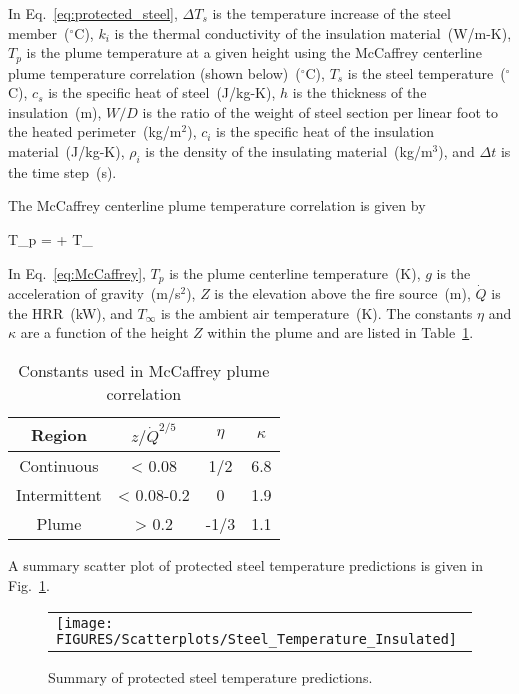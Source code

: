 In Eq.~\ref{eq:protected_steel}, $\Delta T_s$ is the temperature increase of the steel member~($^\circ$C), $k_i$ is the thermal conductivity of the insulation material~(W/m-K), $T_p$ is the plume temperature at a given height using the McCaffrey centerline plume temperature correlation (shown below)~($^\circ$C), $T_s$ is the steel temperature~($^\circ$C), $c_s$ is the specific heat of steel~(J/kg-K), $h$ is the thickness of the insulation~(m), $W/D$ is the ratio of the weight of steel section per linear foot to the heated perimeter~(kg/m$^2$), $c_i$ is the specific heat of the insulation material~(J/kg-K), $\rho_i$ is the density of the insulating material~(kg/m$^3$), and $\Delta t$ is the time step~(s).

The McCaffrey centerline plume temperature correlation is given by

\be
T_p =  + T_\infty
\label{eq:McCaffrey}
\ee

In Eq.~\ref{eq:McCaffrey}, $T_p$ is the plume centerline temperature~(K), $g$ is the acceleration of gravity~(m/s$^2$), $Z$ is the elevation above the fire source~(m), $\dot Q$ is the HRR~(kW), and $T_\infty$ is the ambient air temperature~(K). The constants $\eta$ and $\kappa$ are a function of the height $Z$ within the plume and are listed in Table~\ref{tbl:McCaffrey_constants}.

\vspace{\baselineskip}
\begin{table}[ht]
\begin{center}
\caption{Constants used in McCaffrey plume correlation}
\label{tbl:McCaffrey_constants}
\begin{tabular}{|c|c|c|c|}
\hline
Region & $z/\dot Q^{2/5}$      & $\eta$ & $\kappa$ \\
\hline
Continuous & < 0.08       & 1/2  & 6.8 \\
Intermittent & < 0.08-0.2 & 0     & 1.9 \\
Plume         & > 0.2         & -1/3 & 1.1 \\
\hline
\end{tabular}
\end{center}
\end{table}

\clearpage

A summary scatter plot of protected steel temperature predictions is given in Fig.~\ref{protected_steel_temperature_summary}.

\begin{figure}[ht]
\begin{center}
\begin{tabular}{l}
\texttt{[image: FIGURES/Scatterplots/Steel\_Temperature\_Insulated]}
\end{tabular}
\end{center}
\caption[Summary of protected steel temperature predictions.]
{Summary of protected steel temperature predictions.}
\label{protected_steel_temperature_summary}
\end{figure}

